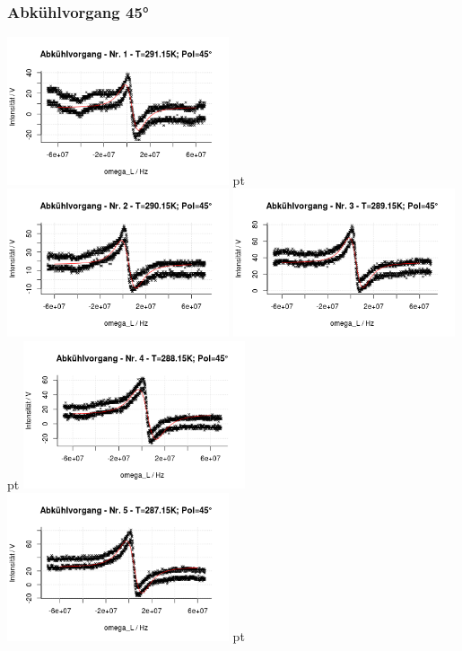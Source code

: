 \documentclass[12pt]{article}
\begin{document}
\begin{minipage}[h!]{\textwidth}
	\end{minipage}\newpage


\subsubsection{Abkühlvorgang 45°}
\begin{minipage}[h!]{\textwidth}
	\centering
	\includegraphics[width=0.49\textwidth]{figures/cold45-1.png} pt
	\includegraphics[width=0.49\textwidth]{figures/cold45-2.png}\vskip -10pt
	\includegraphics[width=0.49\textwidth]{figures/cold45-3.png} pt
	\includegraphics[width=0.49\textwidth]{figures/cold45-4.png}\vskip -10pt
	\includegraphics[width=0.49\textwidth]{figures/cold45-5.png} pt

\end{minipage}
\end{document}
